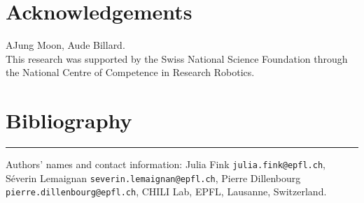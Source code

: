 \documentclass[lettersize, apacite, twoside, HRI]{apa_HRI}
\begin{document}
\section*{Acknowledgements}
AJung Moon, Aude Billard.\\

This research was supported by the Swiss National Science Foundation through
the National Centre of Competence in Research Robotics.

\section{Bibliography}

\hrule
\vspace*{.1in}
Authors' names and contact information: Julia Fink {\tt julia.fink@epfl.ch}, Séverin Lemaignan {\tt severin.lemaignan@epfl.ch}, Pierre Dillenbourg {\tt pierre.dillenbourg@epfl.ch}, CHILI Lab, EPFL, Lausanne, Switzerland.
\end{document}
